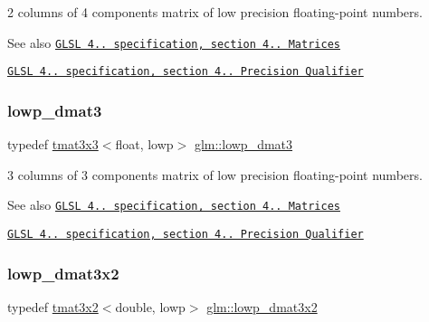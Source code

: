 2 columns of 4 components matrix of low precision floating-\/point numbers.

\begin{DoxySeeAlso}{See also}
\href{http://www.opengl.org/registry/doc/GLSLangSpec.4.20.8.pdf}{\tt G\+L\+SL 4.. specification, section 4.. Matrices} 

\href{http://www.opengl.org/registry/doc/GLSLangSpec.4.20.8.pdf}{\tt G\+L\+SL 4.. specification, section 4.. Precision Qualifier} 
\end{DoxySeeAlso}
\mbox{\label{group__core__precision_ga2a63ac35bb66e49374db9f699bef9597}} 
\subsubsection{\texorpdfstring{lowp\+\_\+dmat3}{lowp\_dmat3}}
{\footnotesize\ttfamily typedef \hyperlink{structglm_1_1tmat3x3}{tmat3x3}$<$float, lowp$>$ \hyperlink{group__core__precision_ga2a63ac35bb66e49374db9f699bef9597}{glm\+::lowp\+\_\+dmat3}}

3 columns of 3 components matrix of low precision floating-\/point numbers.

\begin{DoxySeeAlso}{See also}
\href{http://www.opengl.org/registry/doc/GLSLangSpec.4.20.8.pdf}{\tt G\+L\+SL 4.. specification, section 4.. Matrices} 

\href{http://www.opengl.org/registry/doc/GLSLangSpec.4.20.8.pdf}{\tt G\+L\+SL 4.. specification, section 4.. Precision Qualifier} 
\end{DoxySeeAlso}
\mbox{\label{group__core__precision_gac90dba962673ae315e5504a362d39b1c}} 
\subsubsection{\texorpdfstring{lowp\+\_\+dmat3x2}{lowp\_dmat3x2}}
{\footnotesize\ttfamily typedef \hyperlink{structglm_1_1tmat3x2}{tmat3x2}$<$double, lowp$>$ \hyperlink{group__core__precision_gac90dba962673ae315e5504a362d39b1c}{glm\+::lowp\+\_\+dmat3x2}}

